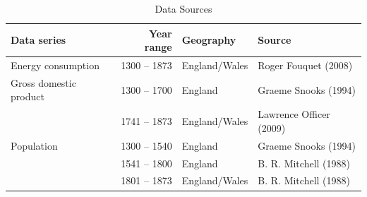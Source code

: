 \documentclass[final]{beamer}
\begin{document}
\begin{frame}
\footnotesize{
\begin{table}[p!]
\caption{Data Sources}
\label{tbl:dataSources}
\begin{tabular}{lrll}
Data series&Year range&Geography&Source\\
\hline
Energy consumption&1300 -- 1873&England/Wales&Roger Fouquet (2008)\\
\hline
Gross domestic product&1300 -- 1700&England&Graeme Snooks (1994)\\
&1741 -- 1873&England/Wales&Lawrence Officer (2009)\\
\hline
Population&1300 -- 1540&England&Graeme Snooks (1994)\\
&1541 -- 1800&England&B. R. Mitchell (1988)\\
&1801 -- 1873&England/Wales&B. R. Mitchell (1988)\\
\end{tabular}
\end{table}
}
\end{frame}

\end{document}
